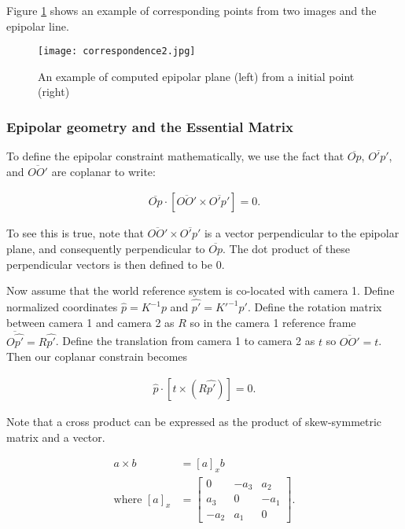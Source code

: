 \documentclass[twoside]{article}
\begin{document}
Figure \ref{correspondence} shows an example of corresponding points from two images and the epipolar line.

\begin{figure}[h!]
  \begin{center}
	\texttt{[image: correspondence2.jpg]}  \end{center}
  \caption{An example of computed epipolar plane (left) from a initial point (right)}
  \label{correspondence}
\end{figure}

\subsubsection{Epipolar geometry and the Essential Matrix}

To define the epipolar constraint mathematically, we use the fact that $\overline{Op}$, $\overline{O'p'}$, and $\overline{OO'}$ are coplanar to write:

\begin{align}
\overline{Op} \cdot [\overline{OO'} \times \overline{O'p'}] = 0.
\end{align}

To see this is true, note that $\overline{OO'} \times \overline{O'p'}$ is a vector perpendicular to the epipolar plane, and consequently perpendicular to $\overline{Op}$. The dot product of these perpendicular vectors is then defined to be 0.

Now assume that the world reference system is co-located with camera 1. Define normalized coordinates $\hat{p} = K^{-1}p$ and $\hat{p'} = K'^{-1}p'$. Define the rotation matrix between camera 1 and camera 2 as $R$ so in the camera 1 reference frame $\overline{O\hat{p'}} = R\hat{p'}$. Define the translation from camera 1 to camera 2 as $t$ so $\overline{OO'} = t$. Then our coplanar constrain becomes

\begin{align}
\hat{p} \cdot [t \times (R\hat{p'})] = 0.
\end{align}

Note that a cross product can be expressed as the product of skew-symmetric matrix and a vector.

\begin{align}
a \times b &= [a]_x b \\
\text{where } [a]_x &= \begin{bmatrix}
0 & -a_3 & a_2 \\
a_3 & 0 & -a_1 \\
-a_2 & a_1 & 0
\end{bmatrix} .
\end{align}
\end{document}
